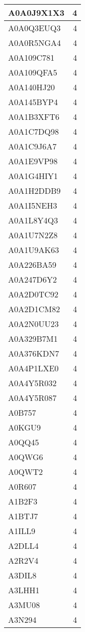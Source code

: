 \documentclass[
]{book}
\theoremstyle{definition}
\theoremstyle{definition}
\theoremstyle{definition}
\theoremstyle{definition}
\theoremstyle{remark}
\begin{document}
\begin{table}
\begin{tabular}{l|r}
\hline
A0A0J9X1X3 & 4\\
\hline
A0A0Q3EUQ3 & 4\\
\hline
A0A0R5NGA4 & 4\\
\hline
A0A109C781 & 4\\
\hline
A0A109QFA5 & 4\\
\hline
A0A140HJ20 & 4\\
\hline
A0A145BYP4 & 4\\
\hline
A0A1B3XFT6 & 4\\
\hline
A0A1C7DQ98 & 4\\
\hline
A0A1C9J6A7 & 4\\
\hline
A0A1E9VP98 & 4\\
\hline
A0A1G4HIY1 & 4\\
\hline
A0A1H2DDB9 & 4\\
\hline
A0A1I5NEH3 & 4\\
\hline
A0A1L8Y4Q3 & 4\\
\hline
A0A1U7N2Z8 & 4\\
\hline
A0A1U9AK63 & 4\\
\hline
A0A226BA59 & 4\\
\hline
A0A247D6Y2 & 4\\
\hline
A0A2D0TC92 & 4\\
\hline
A0A2D1CM82 & 4\\
\hline
A0A2N0UU23 & 4\\
\hline
A0A329B7M1 & 4\\
\hline
A0A376KDN7 & 4\\
\hline
A0A4P1LXE0 & 4\\
\hline
A0A4Y5R032 & 4\\
\hline
A0A4Y5R087 & 4\\
\hline
A0B757 & 4\\
\hline
A0KGU9 & 4\\
\hline
A0QQ45 & 4\\
\hline
A0QWG6 & 4\\
\hline
A0QWT2 & 4\\
\hline
A0R607 & 4\\
\hline
A1B2F3 & 4\\
\hline
A1BTJ7 & 4\\
\hline
A1ILL9 & 4\\
\hline
A2DLL4 & 4\\
\hline
A2R2V4 & 4\\
\hline
A3DIL8 & 4\\
\hline
A3LHH1 & 4\\
\hline
A3MU08 & 4\\
\hline
A3N294 & 4\\

\end{tabular}
\end{table}
\end{document}
